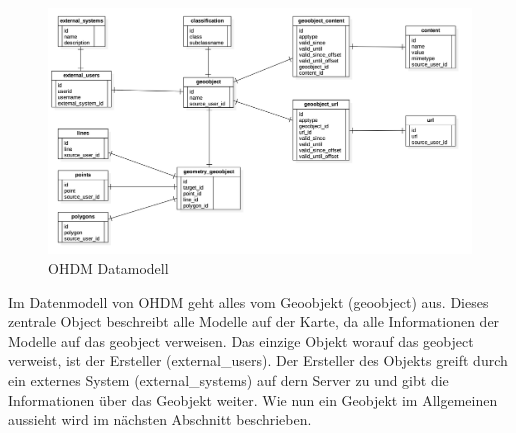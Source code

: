 \begin{figure}[h!]
\centering
\includegraphics[width=127mm]{ohdm_datenmodell/Bilder/ohdm_data_modell.png}
\caption{OHDM Datamodell}
\label{fig:datamodell}
\end{figure}
Im Datenmodell von OHDM geht alles vom Geoobjekt (geoobject) aus. Dieses zentrale Object beschreibt alle Modelle auf der Karte, da alle Informationen der Modelle auf das geobject verweisen. Das einzige Objekt worauf das geobject verweist, ist der Ersteller (external\_users). Der Ersteller des Objekts greift durch ein externes System (external\_systems) auf dern Server zu und gibt die Informationen über das Geobjekt weiter. Wie nun ein Geobjekt im Allgemeinen aussieht wird im nächsten Abschnitt beschrieben.

